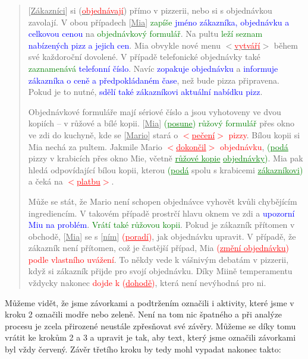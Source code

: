 \begin{quote}
[\underline{Zákazníci}] si (\underline{\textcolor{red}{objednávají}}) přímo v pizzerii, nebo si s objednávkou zavolají. V obou případech [\underline{Mia}] \textcolor{green}{zapíše} \textcolor{blue}{jméno zákazníka, objednávku a celkovou cenou} na \textcolor{green}{objednávkový formulář}. Na pultu \textcolor{green}{leží seznam} \textcolor{blue}{nabízených pizz a jejich cen}. Mia obvykle nové menu $<$\underline{\textcolor{red}{vytváří}}$>$ během své každoroční dovolené. V případě telefonické objednávky také \textcolor{green}{zaznamenává} \textcolor{blue}{telefonní číslo}. Navíc \textcolor{blue}{zopakuje objednávku} a \textcolor{blue}{informuje zákazníka o ceně a předpokládaném čase}, než bude pizza připravena. Pokud je to nutné, \textcolor{blue}{sdělí také zákazníkovi aktuální  nabídku pizz}. 

Objednávkové formuláře mají sériové číslo a jsou vyhotoveny ve dvou kopiích – v růžové a bílé kopii. [\underline{Mia}] \textcolor{green}{(\underline{posune}) růžový formulář} přes okno ve zdi do kuchyně, kde se [\underline{Mario}] stará o \textcolor{red}{$<$\underline{pečení}$>$ pizzy}. Bílou kopii si Mia nechá za pultem. Jakmile Mario \textcolor{red}{$<$\underline{dokončil}$>$ objednávku}, \textcolor{green}{(\underline{podá}} pizzy v krabicích přes okno Mie, včetně \textcolor{green}{\underline{růžové kopie} \underline{objednávky})}. Mia pak hledá odpovídající bílou kopii, kterou \textcolor{green}{(\underline{podá}} spolu s krabicemi \textcolor{green}{\underline{zákazníkovi})} a čeká na \textcolor{red}{$<$\underline{platbu}$>$}. 

Může se stát, že Mario není schopen objednávce vyhovět kvůli chybějícím ingrediencím. V takovém případě prostrčí hlavu oknem ve zdi a \textcolor{blue}{upozorní Miu na problém}. \textcolor{green}{Vrátí také růžovou kopii}. Pokud je zákazník přítomen v obchodě, [\underline{Mia}] se s [\underline{ním}] \textcolor{red}{(\underline{poradí})}, jak objednávku upravit. V případě, že zákazník není přítomen, což je častější případ, Mia \textcolor{red}{(\underline{změní objednávku}) podle vlastního uvážení}. To někdy vede k vášnivým debatám v pizzerii, když si zákazník přijde pro svojí objednávku. Díky Miině temperamentu vždycky nakonec \textcolor{red}{dojde k (\underline{dohodě})}, která není nevýhodná pro ni.
\end{quote}

Můžeme vidět, že jsme závorkami a podtržením označili i aktivity, které jsme v kroku 2 označili modře nebo zeleně. Není na tom nic špatného a při analýze procesu je zcela přirozené neustále zpřesňovat své závěry. Můžeme se díky tomu vrátit ke krokům 2 a 3 a upravit je tak, aby text, který jsme označili závorkami byl vždy červený. Závěr třetího kroku by tedy mohl vypadat nakonec takto:

